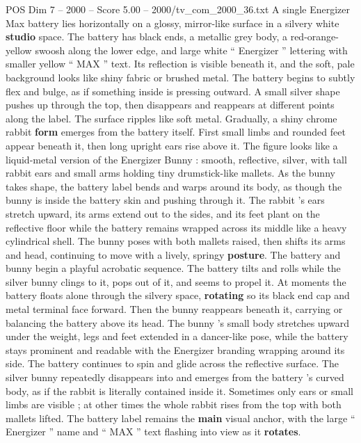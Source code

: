 \begin{textsample}{POS Dim 7 – 2000 – Score 5.00 – 2000/tv\_com\_2000\_36.txt}  \label{ex:f7_pos_079}
A single Energizer Max battery lies horizontally on a glossy, mirror-like surface in a silvery white \textbf{studio} space.
The battery has black ends, a metallic grey body, a red-orange-yellow swoosh along the lower edge, and large white “ Energizer ” lettering with smaller yellow “ MAX ” text.
Its reflection is visible beneath it, and the soft, pale background looks like shiny fabric or brushed metal.
The battery begins to subtly flex and bulge, as if something inside is pressing outward.
A small silver shape pushes up through the top, then disappears and reappears at different points along the label.
The surface ripples like soft metal.
Gradually, a shiny chrome rabbit \textbf{form} emerges from the battery itself.
First small limbs and rounded feet appear beneath it, then long upright ears rise above it.
The figure looks like a liquid-metal version of the Energizer Bunny : smooth, reflective, silver, with tall rabbit ears and small arms holding tiny drumstick-like mallets.
As the bunny takes shape, the battery label bends and warps around its body, as though the bunny is inside the battery skin and pushing through it.
The rabbit ’s ears stretch upward, its arms extend out to the sides, and its feet plant on the reflective floor while the battery remains wrapped across its middle like a heavy cylindrical shell.
The bunny poses with both mallets raised, then shifts its arms and head, continuing to move with a lively, springy \textbf{posture}.
The battery and bunny begin a playful acrobatic sequence.
The battery tilts and rolls while the silver bunny clings to it, pops out of it, and seems to propel it.
At moments the battery floats alone through the silvery space, \textbf{rotating} so its black end cap and metal terminal face forward.
Then the bunny reappears beneath it, carrying or balancing the battery above its head.
The bunny ’s small body stretches upward under the weight, legs and feet extended in a dancer-like pose, while the battery stays prominent and readable with the Energizer branding wrapping around its side.
The battery continues to spin and glide across the reflective surface.
The silver bunny repeatedly disappears into and emerges from the battery ’s curved body, as if the rabbit is literally contained inside it.
Sometimes only ears or small limbs are visible ; at other times the whole rabbit rises from the top with both mallets lifted.
The battery label remains the \textbf{main} visual anchor, with the large “ Energizer ” name and “ MAX ” text flashing into view as it \textbf{rotates}.

\end{textsample}
